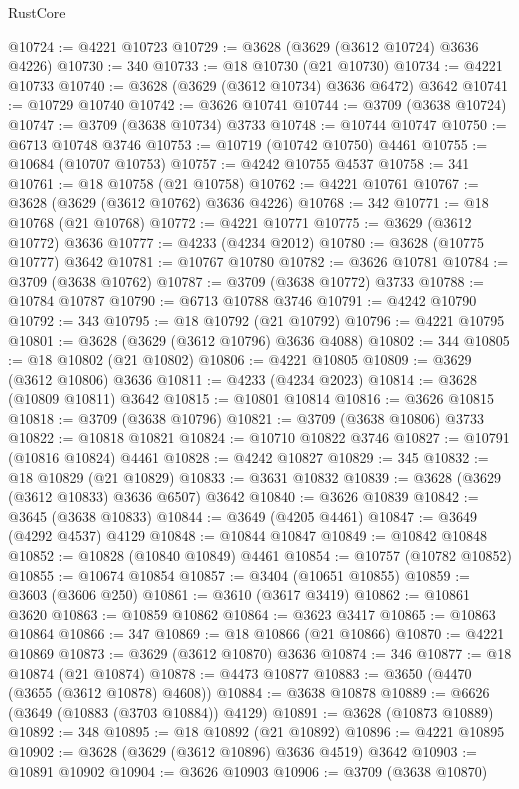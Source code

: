 \begin{lexlean}{RustCore}
\begin{coremodule}
@10724 := @4221 @10723
@10729 := @3628 (@3629 (@3612 @10724) @3636 @4226)
@10730 := 340
@10733 := @18 @10730 (@21 @10730)
@10734 := @4221 @10733
@10740 := @3628 (@3629 (@3612 @10734) @3636 @6472) @3642
@10741 := @10729 @10740
@10742 := @3626 @10741
@10744 := @3709 (@3638 @10724)
@10747 := @3709 (@3638 @10734) @3733
@10748 := @10744 @10747
@10750 := @6713 @10748 @3746
@10753 := @10719 (@10742 @10750) @4461
@10755 := @10684 (@10707 @10753)
@10757 := @4242 @10755 @4537
@10758 := 341
@10761 := @18 @10758 (@21 @10758)
@10762 := @4221 @10761
@10767 := @3628 (@3629 (@3612 @10762) @3636 @4226)
@10768 := 342
@10771 := @18 @10768 (@21 @10768)
@10772 := @4221 @10771
@10775 := @3629 (@3612 @10772) @3636
@10777 := @4233 (@4234 @2012)
@10780 := @3628 (@10775 @10777) @3642
@10781 := @10767 @10780
@10782 := @3626 @10781
@10784 := @3709 (@3638 @10762)
@10787 := @3709 (@3638 @10772) @3733
@10788 := @10784 @10787
@10790 := @6713 @10788 @3746
@10791 := @4242 @10790
@10792 := 343
@10795 := @18 @10792 (@21 @10792)
@10796 := @4221 @10795
@10801 := @3628 (@3629 (@3612 @10796) @3636 @4088)
@10802 := 344
@10805 := @18 @10802 (@21 @10802)
@10806 := @4221 @10805
@10809 := @3629 (@3612 @10806) @3636
@10811 := @4233 (@4234 @2023)
@10814 := @3628 (@10809 @10811) @3642
@10815 := @10801 @10814
@10816 := @3626 @10815
@10818 := @3709 (@3638 @10796)
@10821 := @3709 (@3638 @10806) @3733
@10822 := @10818 @10821
@10824 := @10710 @10822 @3746
@10827 := @10791 (@10816 @10824) @4461
@10828 := @4242 @10827
@10829 := 345
@10832 := @18 @10829 (@21 @10829)
@10833 := @3631 @10832
@10839 := @3628 (@3629 (@3612 @10833) @3636 @6507) @3642
@10840 := @3626 @10839
@10842 := @3645 (@3638 @10833)
@10844 := @3649 (@4205 @4461)
@10847 := @3649 (@4292 @4537) @4129
@10848 := @10844 @10847
@10849 := @10842 @10848
@10852 := @10828 (@10840 @10849) @4461
@10854 := @10757 (@10782 @10852)
@10855 := @10674 @10854
@10857 := @3404 (@10651 @10855)
@10859 := @3603 (@3606 @250)
@10861 := @3610 (@3617 @3419)
@10862 := @10861 @3620
@10863 := @10859 @10862
@10864 := @3623 @3417
@10865 := @10863 @10864
@10866 := 347
@10869 := @18 @10866 (@21 @10866)
@10870 := @4221 @10869
@10873 := @3629 (@3612 @10870) @3636
@10874 := 346
@10877 := @18 @10874 (@21 @10874)
@10878 := @4473 @10877
@10883 := @3650 (@4470 (@3655 (@3612 @10878) @4608))
@10884 := @3638 @10878
@10889 := @6626 (@3649 (@10883 (@3703 @10884)) @4129)
@10891 := @3628 (@10873 @10889)
@10892 := 348
@10895 := @18 @10892 (@21 @10892)
@10896 := @4221 @10895
@10902 := @3628 (@3629 (@3612 @10896) @3636 @4519) @3642
@10903 := @10891 @10902
@10904 := @3626 @10903
@10906 := @3709 (@3638 @10870)

\end{coremodule}
\end{lexlean}
